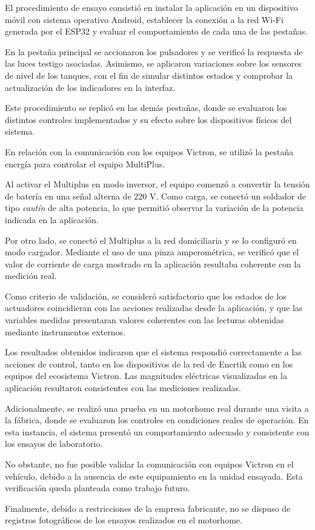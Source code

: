 El procedimiento de ensayo consistió en instalar la aplicación en un dispositivo móvil con sistema operativo Android, establecer la conexión a la red Wi-Fi generada por el ESP32 y evaluar el comportamiento de cada una de las pestañas.

En la pestaña principal se accionaron los pulsadores y se verificó la respuesta de las luces testigo asociadas. Asimismo, se aplicaron variaciones sobre los sensores de nivel de los tanques, con el fin de simular distintos estados y comprobar la actualización de los indicadores en la interfaz.

Este procedimiento se replicó en las demás pestañas, donde se evaluaron los distintos controles implementados y su efecto sobre los dispositivos físicos del sistema.

\newpage
En relación con la comunicación con los equipos Victron, se utilizó la pestaña energía para controlar el equipo MultiPlus. 

Al activar el Multiplus en modo inversor, el equipo comenzó a convertir la tensión
de batería en una señal alterna de 220 V. Como carga, se conectó un soldador de
tipo \textit{cautín} de alta potencia, lo que permitió observar la variación de la potencia
indicada en la aplicación.

Por otro lado, se conectó el Multiplus a la red domiciliaria y se lo configuró en
modo cargador. Mediante el uso de una pinza amperométrica, se verificó que el
valor de corriente de carga mostrado en la aplicación resultaba coherente con la
medición real.

Como criterio de validación, se consideró satisfactorio que los estados de los actuadores coincidieran con las acciones realizadas desde la aplicación, y que las variables medidas presentaran valores coherentes con las lecturas obtenidas mediante instrumentos externos.

Los resultados obtenidos indicaron que el sistema respondió correctamente a las acciones de control, tanto en los dispositivos de la red de Enertik como en los equipos del ecosistema Victron. Las magnitudes eléctricas visualizadas en la aplicación resultaron consistentes con las mediciones realizadas.

Adicionalmente, se realizó una prueba en un motorhome real durante una visita a la fábrica, donde se evaluaron los controles en condiciones reales de operación. En esta instancia, el sistema presentó un comportamiento adecuado y consistente con los ensayos de laboratorio.

No obstante, no fue posible validar la comunicación con equipos Victron en el vehículo, debido a la ausencia de este equipamiento en la unidad ensayada. Esta verificación queda planteada como trabajo futuro.

Finalmente, debido a restricciones de la empresa fabricante, no se dispuso de registros fotográficos de los ensayos realizados en el motorhome.